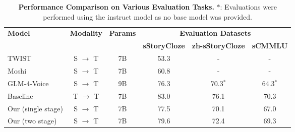 \begin{table}[htb]
    \caption{\textbf{Performance Comparison on Various Evaluation Tasks.} $\ast$: Evaluations were performed using the instruct model as no base model was provided.}
    \label{tab:iq-performance}
    \centering
    \begin{tabular}{@{}lccccc@{}}
        \toprule
        \multirow{2}{*}{\textbf{Model}}   & \multirow{2}{*}{\textbf{Modality}} & \multirow{2}{*}{\textbf{Params}} & \multicolumn{3}{c}{\textbf{Evaluation Datasets}} \\ \cmidrule(l){4-6}
                         &                   &                 & \textbf{sStoryCloze} & \textbf{zh-sStoryCloze} & \textbf{sCMMLU} \\ \midrule
        TWIST            & S $\to$ T         & 7B               & 53.3                  & -                       & -              \\
        Moshi            & S $\to$ T         & 7B               & 60.8                  & -                       & -              \\
        GLM-4-Voice      & S $\to$ T         & 9B               & 76.3                  & 70.3$^{\ast}$                       & 64.3$^{\ast}$              \\
        \midrule
        Baseline         & T $\to$ T         & 7B               & 83.0                  & 76.1                    & 70.3           \\
        Our (single stage)  & S $\to$ T         & 7B               & 77.5                  & 70.1                    & 67.0           \\
        Our (two stage)     & S $\to$ T         & 7B               & 79.6                  & 72.4                    & 69.3           \\ \bottomrule
    \end{tabular}
\end{table}
